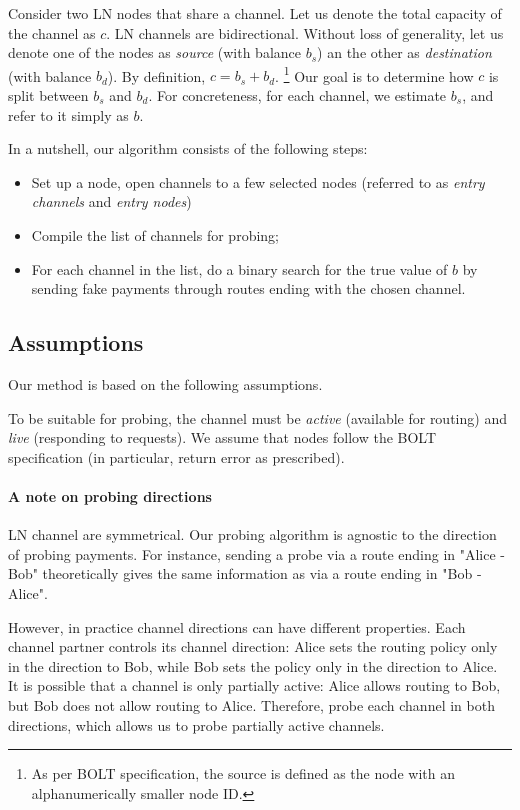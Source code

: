 Consider two LN nodes that share a channel.
Let us denote the total capacity of the channel as $c$.
LN channels are bidirectional.
Without loss of generality, let us denote one of the nodes as \textit{source} (with balance $b_s$) an the other as \textit{destination} (with balance $b_d$).
By definition, $c = b_s + b_d$.
\footnote{As per BOLT specification, the source is defined as the node with an alphanumerically smaller node ID.}
Our goal is to determine how $c$ is split between $b_s$ and $b_d$.
For concreteness, for each channel, we estimate $b_s$, and refer to it simply as $b$.

In a nutshell, our algorithm consists of the following steps:
\begin{itemize}
	\item Set up a node, open channels to a few selected nodes (referred to as \textit{entry channels} and \textit{entry nodes})
	\item Compile the list of channels for probing;
	\item For each channel in the list, do a binary search for the true value of $b$ by sending fake payments through routes ending with the chosen channel.
\end{itemize}

\subsection{Assumptions}

Our method is based on the following assumptions.

To be suitable for probing, the channel must be \textit{active} (available for routing) and \textit{live} (responding to requests).
We assume that nodes follow the BOLT specification (in particular, return error as prescribed).

\paragraph{A note on probing directions}

LN channel are symmetrical.
Our probing algorithm is agnostic to the direction of probing payments.
For instance, sending a probe via a route ending in "Alice - Bob" theoretically gives the same information as via a route ending in "Bob - Alice".

However, in practice channel directions can have different properties.
Each channel partner controls its channel direction: Alice sets the routing policy only in the direction to Bob, while Bob sets the policy only in the direction to Alice.
It is possible that a channel is only partially active: Alice allows routing to Bob, but Bob does not allow routing to Alice.
Therefore, probe each channel in both directions, which allows us to probe partially active channels.

